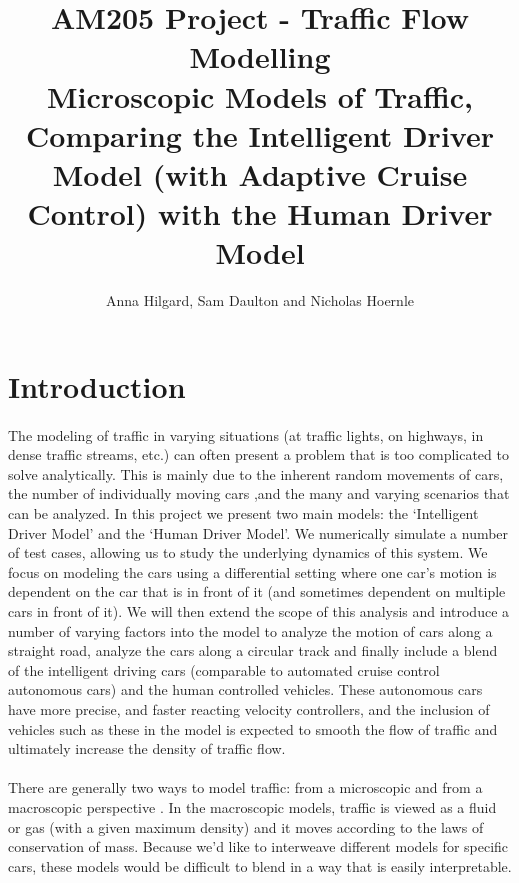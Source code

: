 \documentclass[12pt]{article}
\title{AM205 Project - Traffic Flow Modelling\\
\Large{Microscopic Models of Traffic, Comparing the Intelligent Driver Model (with Adaptive Cruise Control) with the Human Driver Model}}
\author
{Anna Hilgard, Sam Daulton and Nicholas Hoernle}
\date{}
\begin{document}

\maketitle

\section{Introduction}

\paragraph{}
The modeling of traffic in varying situations (at traffic lights, on highways, in dense traffic streams, etc.) can often present a problem that is too complicated to solve analytically. This is mainly due to the inherent random movements of cars, the number of individually moving cars ,and the many and varying scenarios that can be analyzed.
In this project we present two main models: the `Intelligent Driver Model' and the `Human Driver Model'. We numerically simulate a number of test cases, allowing us to study the underlying dynamics of this system. We focus on modeling the cars using a differential setting where one car's motion is dependent on the car that is in front of it (and sometimes dependent on multiple cars in front of it). We will then extend the scope of this analysis and introduce a number of varying factors into the model to analyze the motion of cars along a straight road, analyze the cars along a circular track and finally include a blend of the intelligent driving cars (comparable to automated cruise control autonomous cars) and the human controlled vehicles. These autonomous cars have more precise, and faster reacting velocity controllers, and the inclusion of vehicles such as these in the model is expected to smooth the flow of traffic and ultimately increase the density of traffic flow.

\paragraph{}There are generally two ways to model traffic: from a microscopic and from a macroscopic perspective \cite[Chapter~34]{microscopic_modelling}. In the macroscopic models, traffic is viewed as a fluid or gas (with a given maximum density) and it moves according to the laws of conservation of mass. Because we'd like to interweave different models for specific cars, these models would be difficult to blend in a way that is easily interpretable.
\end{document}
